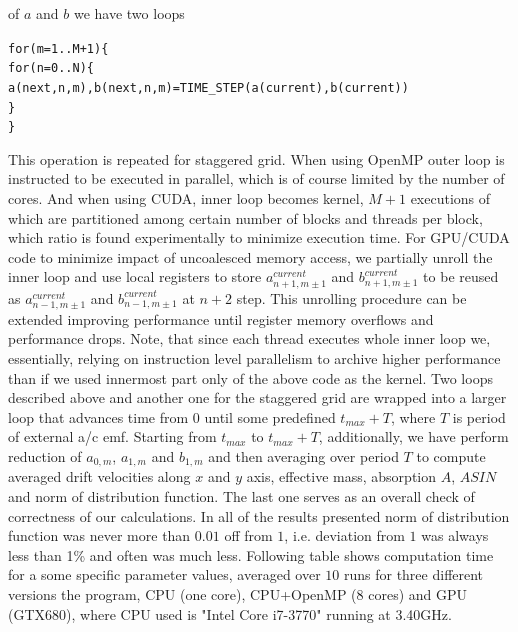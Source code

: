 \documentclass[40pt,letterpaper,physrev]{article}
\begin{document}
	of $a$ and $b$ we have two loops 
	\begin{alltt}
    for( m = 1 .. M+1 ) \{
        for( n = 0 .. N ) \{
            a(next,n,m), b(next,n,m) = TIME_STEP( a(current), b(current) )
        \}
    \}
	\end{alltt}
	This operation is repeated for staggered grid. When using OpenMP outer loop is instructed to be executed in parallel, 
	which is of course limited by the number of cores. And when using CUDA, inner loop becomes kernel, $M+1$ executions of 
	which are partitioned among certain number of blocks and threads per block, which ratio is found experimentally to minimize 
	execution time. For GPU/CUDA code to minimize impact of uncoalesced memory access, we partially unroll the inner loop 
	and use local registers to store $a^{current}_{n+1,m\pm 1}$ and $b^{current}_{n+1,m\pm 1}$ to be reused as
	$a^{current}_{n-1,m\pm 1}$ and $b^{current}_{n-1,m\pm 1}$ at $n+2$ step. This unrolling procedure can be extended 
	improving performance until register memory overflows and performance drops. Note, that since each thread executes 
	whole inner loop we, essentially, relying on instruction level parallelism to archive higher performance than if 
	we used innermost part only of the above code as the kernel. Two loops described above and another one for the staggered grid
	are wrapped into a larger loop that advances time from $0$ until some predefined $t_{max}+T$, where $T$ is period of external
	a/c emf. Starting from $t_{max}$ to $t_{max}+T$, additionally, we have perform reduction of $a_{0,m}$, $a_{1,m}$ and $b_{1,m}$
	and then averaging over period $T$ to compute averaged drift velocities along $x$ and $y$ axis, effective mass, absorption $A$,
	$ASIN$ and norm of distribution function. The last one serves as an overall check of correctness of our calculations. In all
	of the results presented norm of distribution function was never more than $0.01$ off from $1$, i.e. deviation from $1$ was 
	always less than 1\% and often was much less. Following table shows computation time for a some specific parameter values,
	averaged over $10$ runs for three different versions the program, CPU (one core), CPU+OpenMP (8 cores) and GPU (GTX680), 
	where CPU used is "Intel Core i7-3770" running at 3.40GHz.
        
\end{document}
